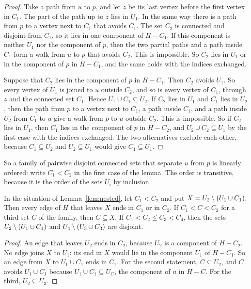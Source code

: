 \begin{proof}
Take a path from $u$ to $p$, and let $z$ be its last vertex before the first vertex in $C_1$. The
part of the path up to $z$ lies in $U_1$. In the same way there is a path from $p$ to a vertex next
to $C_1$ that avoids $C_1$. The set $C_2$ is connected and disjoint from $C_1$, so it lies in one
component of $H-C_1$. If this component is neither $U_1$ nor the component of $p$, then the two
partial paths and a path inside $C_1$ form a walk from $u$ to $p$ that avoids $C_2$. This is
impossible. So $C_2$ lies in $U_1$ or in the component of $p$ in $H-C_1$, and the same holds with
the indices exchanged.

Suppose that $C_2$ lies in the component of $p$ in $H-C_1$. Then $C_2$ avoids $U_1$. So every
vertex of $U_1$ is joined to $u$ outside $C_2$, and so is every vertex of $C_1$, through $z$ and
the connected set $C_1$. Hence $U_1\cup C_1\subseteq U_2$. If $C_2$ lies in $U_1$ and $C_1$ lies in
$U_2$, then the path from $p$ to a vertex next to $C_1$, a path inside $C_1$, and a path inside
$U_2$ from $C_1$ to $u$ give a walk from $p$ to $u$ outside $C_2$. This is impossible. So if $C_2$
lies in $U_1$, then $C_1$ lies in the component of $p$ in $H-C_2$, and
$U_2\cup C_2\subseteq U_1$ by the first case with the indices exchanged. The two alternatives
exclude each other, because $C_1\subseteq U_2$ and $U_2\subseteq U_1$ would give
$C_1\subseteq U_1$.
\end{proof}

So a family of pairwise disjoint connected sets that separate $u$ from $p$ is linearly ordered:
write $C_1<C_2$ in the first case of the lemma. The order is transitive, because it is the order
of the sets $U_i$ by inclusion.

\begin{lemma}[Blocks]\label{lem:blocks}
In the situation of Lemma~\ref{lem:nested}, let $C_1<C_2$ and put
$X=U_2\setminus(U_1\cup C_1)$. Then every edge of $H$ that leaves $X$ ends in $C_1$ or in $C_2$. If
$C_1<C<C_2$ for a third set $C$ of the family, then $C\subseteq X$. If $C_1<C_2\le C_3<C_4$, then
the sets $U_2\setminus(U_1\cup C_1)$ and $U_4\setminus(U_3\cup C_3)$ are disjoint.
\end{lemma}

\begin{proof}
An edge that leaves $U_2$ ends in $C_2$, because $U_2$ is a component of $H-C_2$. No edge joins
$X$ to $U_1$: its end in $X$ would lie in the component $U_1$ of $H-C_1$. So an edge from $X$ to
$U_1\cup C_1$ ends in $C_1$. For the second statement,
$C\subseteq U_2$, and $C$ avoids $U_1\cup C_1$ because $U_1\cup C_1\subseteq U_C$, the component of
$u$ in $H-C$. For the third, $U_2\subseteq U_3$.
\end{proof}

